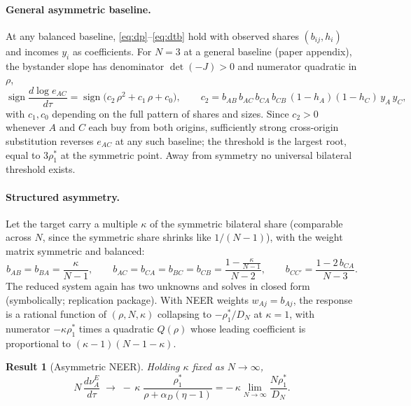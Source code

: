 \documentclass[11pt]{article}
\newtheorem{result}{Result}[section]
\begin{document}
\paragraph{General asymmetric baseline.} At any balanced baseline, \eqref{eq:dp}--\eqref{eq:dtb} hold with observed shares $(b_{ij}, h_i)$ and incomes $y_i$ as coefficients. For $N = 3$ at a general baseline (paper appendix), the bystander slope has denominator $\det(-J) > 0$ and numerator quadratic in $\rho$,
\begin{equation}
\operatorname{sign} \frac{d\log e_{AC}}{d\tau}
= \operatorname{sign}\big( c_2\, \rho^2 + c_1\, \rho + c_0 \big),
\qquad
c_2 = b_{AB}\, b_{AC}\, b_{CA}\, b_{CB}\, (1-h_A)(1-h_C)\, y_A\, y_C ,
\label{eq:asym-quad}
\end{equation}
with $c_1, c_0$ depending on the full pattern of shares and sizes. Since $c_2 > 0$ whenever $A$ and $C$ each buy from both origins, sufficiently strong cross-origin substitution reverses $e_{AC}$ at any such baseline; the threshold is the largest root, equal to $3\rho_1^*$ at the symmetric point. Away from symmetry no universal bilateral threshold exists.

\paragraph{Structured asymmetry.} Let the target carry a multiple $\kappa$ of the symmetric bilateral share (comparable across $N$, since the symmetric share shrinks like $1/(N-1)$), with the weight matrix symmetric and balanced:
\begin{equation}
b_{AB} = b_{BA} = \frac{\kappa}{N-1},
\qquad
b_{AC} = b_{CA} = b_{BC} = b_{CB} = \frac{1 - \frac{\kappa}{N-1}}{N-2},
\qquad
b_{CC'} = \frac{1 - 2\,b_{CA}}{N-3} .
\label{eq:kappa-b}
\end{equation}
The reduced system again has two unknowns and solves in closed form (symbolically; replication package). With NEER weights $w_{Aj} = b_{Aj}$, the response is a rational function of $(\rho, N, \kappa)$ collapsing to $-\rho_1^*/D_N$ at $\kappa = 1$, with numerator $-\kappa\rho_1^*$ times a quadratic $Q(\rho)$ whose leading coefficient is proportional to $(\kappa-1)(N-1-\kappa)$.

\begin{result}[Asymmetric NEER]
Holding $\kappa$ fixed as $N \to \infty$,
\begin{equation}
N\,\frac{d\nu_A^E}{d\tau}
\;\longrightarrow\;
-\,\kappa\;\frac{\rho_1^*}{\rho + \alpha_D(\eta-1)}
= -\,\kappa \lim_{N\to\infty}\frac{N\rho_1^*}{D_N} .
\label{eq:kappa-neer}
\end{equation}
\label{res:kappa}
\end{result}
\end{document}

